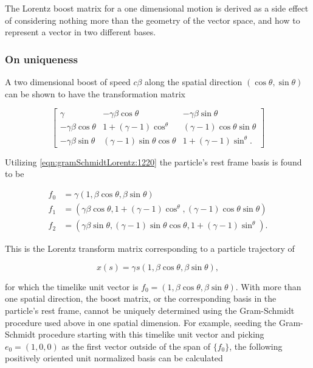 The Lorentz boost matrix for a one dimensional motion is derived as a side effect of considering nothing more than the geometry of the vector space, and how to represent a vector in two different bases.

\subsubsection{On uniqueness}

A two dimensional boost of speed $c \beta$ along the spatial direction $(\cos\theta, \sin\theta)$ can be shown to have the transformation matrix

\begin{equation}\label{eqn:gramSchmidtLorentz:n}
\begin{bmatrix}
\gamma & -\gamma \beta \cos\theta & -\gamma \beta \sin\theta \\
-\gamma \beta \cos\theta & 1 + (\gamma -1) \cos^\theta & (\gamma -1) \cos\theta \sin\theta \\
-\gamma \beta \sin\theta & (\gamma -1) \sin\theta \cos\theta & 1 + (\gamma -1) \sin^\theta.
\end{bmatrix}
\end{equation}

Utilizing \ref{eqn:gramSchmidtLorentz:1220} the particle's rest frame basis is found to be

\begin{align}\label{eqn:gramSchmidtLorentz:n}
f_0 &= \gamma ( 1, \beta \cos\theta, \beta\sin\theta ) \\
f_1 &= (\gamma \beta \cos\theta, 1 + (\gamma -1) \cos^\theta, (\gamma -1) \cos\theta \sin\theta) \\
f_2 &= (\gamma \beta \sin\theta, (\gamma -1) \sin\theta \cos\theta, 1 + (\gamma -1) \sin^\theta).
\end{align}

This is the Lorentz transform matrix corresponding to a particle trajectory of

\begin{equation}\label{eqn:gramSchmidtLorentz:800}
x(s) = \gamma s ( 1, \beta \cos\theta, \beta \sin\theta),
\end{equation}

for which the timelike unit vector is $f_0 = ( 1, \beta \cos\theta, \beta \sin\theta )$.  With more than one spatial direction, the boost matrix, or the corresponding basis in the particle's rest frame, cannot be uniquely determined using the Gram-Schmidt procedure used above in one spatial dimension.  For example, seeding the Gram-Schmidt procedure starting with this timelike unit vector and picking $e_0 = (1, 0, 0)$ as the first vector outside of the span of $\{f_0\}$, the following positively oriented unit normalized basis can be calculated

